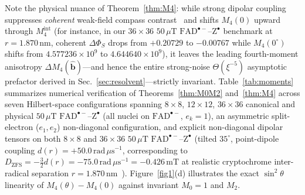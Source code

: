 \documentclass[twocolumn,10pt,amsmath,amssymb,floatfix]{revtex4-2}
\theoremstyle{plain}
\theoremstyle{definition}
\newcommand{\DeltaPhi}{\Delta\Phi_S}
\begin{document}
Note the physical nuance of Theorem~\ref{thm:M4}: while strong dipolar coupling suppresses \emph{coherent} weak-field compass contrast~\cite{Efimova2008BJ,Babcock2020JPCL} and shifts $M_4(0)$ upward through $M_4^{\mathrm{int}}$ (for instance, in our $36\times 36$ $50\,\mu\text{T}$ $\mathrm{FAD}^{\bullet-}\text{--}\mathrm{Z}^{\bullet}$ benchmark at $r=1.870\,\text{nm}$, coherent $\DeltaPhi$ drops from $+0.20729$ to $-0.00767$ while $M_4(0^\circ)$ shifts from $4.577236\times 10^9$ to $4.644640\times 10^9$), it leaves the leading fourth-moment anisotropy $\Delta M_4(\hat{\mathbf{b}})$---and hence the entire strong-noise $\Theta(\xi^{-5})$ asymptotic prefactor derived in Sec.~\ref{sec:resolvent}---strictly invariant. Table~\ref{tab:moments} summarizes numerical verification of Theorems~\ref{thm:M0M2} and~\ref{thm:M4} across seven Hilbert-space configurations spanning $8\times 8$, $12\times 12$, $36\times 36$ canonical and physical $50\,\mu\text{T}$ $\mathrm{FAD}^{\bullet-}\text{--}\mathrm{Z}^{\bullet}$ (all nuclei on $\mathrm{FAD}^{\bullet-}$, $e_k=1$), an asymmetric split-electron ($e_1,e_2$) non-diagonal configuration, and explicit non-diagonal dipolar tensors on both $8\times 8$ and $36\times 36$ $50\,\mu\text{T}$ $\mathrm{FAD}^{\bullet-}\text{--}\mathrm{Z}^{\bullet}$ (tilted $35^\circ$, point-dipole coupling $d(r)=+50.0\,\text{rad}\,\mu\text{s}^{-1}$, corresponding to $D_{\mathrm{ZFS}} = -\frac{3}{2}d(r) = -75.0\,\text{rad}\,\mu\text{s}^{-1} = -0.426\,\text{mT}$ at realistic cryptochrome inter-radical separation $r = 1.870\,\text{nm}$~\cite{Efimova2008BJ,Babcock2020JPCL}). Figure~\ref{fig1}(d) illustrates the exact $\sin^2\theta$ linearity of $M_4(\theta)-M_4(0)$ against invariant $M_0=1$ and $M_2$.
\end{document}

